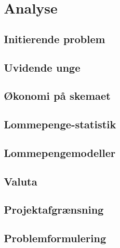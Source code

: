 \documentclass[12pt,a4paper]{report}
\begin{document}
%





\newpage
\thispagestyle{empty}
\mbox{}

\chapter{Analyse}

\section{Initierende problem}


\section{Uvidende unge}
\label{UvidendeUnge}


\section{Økonomi på skemaet}
\label{Okonomi}


\section{Lommepenge-statistik}
\label{LommeStat}


\section{Lommepengemodeller}
\label{LommeModeller}

%

\section{Valuta}
\label{Valuta}


\section{Projektafgrænsning}


\section{Problemformulering}



%

\newpage
\thispagestyle{empty}
\mbox{}



\end{document}
